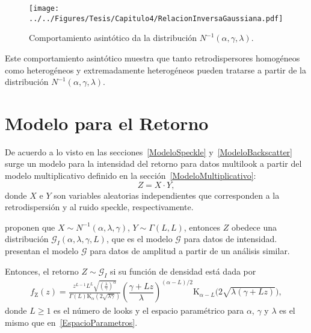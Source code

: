 \begin{figure}[hbt]
	\centering    
	\texttt{[image: ../../Figures/Tesis/Capitulo4/RelacionInversaGaussiana.pdf]}
	\caption{\label{RelacionInversaGaussiana}Comportamiento asintótico da la distribución $N^{-1}(\alpha,\gamma,\lambda)$.} %
\end{figure} 

Este comportamiento asintótico muestra que tanto retrodispersores homogéneos como heterogéneos y extremadamente heterogéneos pueden tratarse a partir de la distribución $N^{-1}(\alpha,\gamma,\lambda)$.


\section{Modelo para el Retorno}
\label{Retorno}

De acuerdo a lo visto en las secciones~\ref{ModeloSpeckle} y~\ref{ModeloBackscatter} surge un modelo para la intensidad del retorno para datos multilook a partir del modelo multiplicativo definido en la sección~\ref{ModeloMultiplicativo}:
\begin{equation*}
Z=X \cdot Y  ,
\end{equation*}
donde $X$ e $Y$ son variables aleatorias independientes que corresponden a la retrodispersión y al ruido speckle, respectivamente. 

 \citet{Frery99} proponen que $X \sim N^{-1}(\alpha,\lambda,\gamma )$, $Y \sim \Gamma(L,L)$, entonces $Z$ obedece una distribución $\mathcal G_I(\alpha,\lambda,\gamma,L )$, que es el modelo $\mathcal{G}$ para datos de intensidad. \citet{Frery97} presentan el modelo $\mathcal{G}$ para datos de amplitud a partir de un análisis similar.

Entonces, el retorno $Z \sim \mathcal{G}_I$ si su función de densidad está dada por
\begin{align}
\label{ModeloGI}
f_{\text{Z}}( z) =\frac{z^{L-1} L^L \sqrt{(\frac{\lambda}{\gamma})^{\alpha}}}{\Gamma(L)\text{K}_{\alpha}(2 \sqrt{\lambda \gamma})} \left(\dfrac{\gamma + Lz}{\lambda}\right)^{(\alpha-L)/2} \text{K}_{\alpha-L}\Big(2\sqrt{\lambda(\gamma+Lz) }\Big),
\end{align}
donde $L\geq 1$ es el número de looks y el espacio paramétrico para $\alpha$, $\gamma$ y $\lambda$ es el mismo que en~\eqref{EspacioParametros}.

